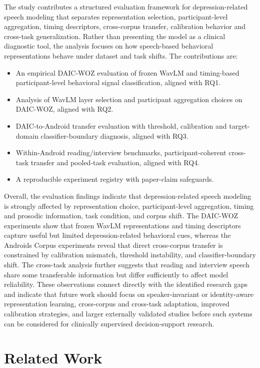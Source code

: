 \documentclass[lettersize,journal]{IEEEtran}
\begin{document}
The study contributes a structured evaluation framework for depression-related speech modeling that separates representation selection, participant-level aggregation, timing descriptors, cross-corpus transfer, calibration behavior and cross-task generalization. Rather than presenting the model as a clinical diagnostic tool, the analysis focuses on how speech-based behavioral representations behave under dataset and task shifts. The contributions are:

\begin{itemize}
\item An empirical DAIC-WOZ evaluation of frozen WavLM and timing-based participant-level behavioral signal classification, aligned with RQ1.
\item Analysis of WavLM layer selection and participant aggregation choices on DAIC-WOZ, aligned with RQ2.
\item DAIC-to-Android transfer evaluation with threshold, calibration and target-domain classifier-boundary diagnosis, aligned with RQ3.
\item Within-Android reading/interview benchmarks, participant-coherent cross-task transfer and pooled-task evaluation, aligned with RQ4.
\item A reproducible experiment registry with paper-claim safeguards.
\end{itemize}

Overall, the evaluation findings indicate that depression-related speech modeling is strongly affected by representation choice, participant-level aggregation, timing and prosodic information, task condition, and corpus shift. The DAIC-WOZ experiments show that frozen WavLM representations and timing descriptors capture useful but limited depression-related behavioral cues, whereas the Androids Corpus experiments reveal that direct cross-corpus transfer is constrained by calibration mismatch, threshold instability, and classifier-boundary shift. The cross-task analysis further suggests that reading and interview speech share some transferable information but differ sufficiently to affect model reliability. These observations connect directly with the identified research gaps and indicate that future work should focus on speaker-invariant or identity-aware representation learning, cross-corpus and cross-task adaptation, improved calibration strategies, and larger externally validated studies before such systems can be considered for clinically supervised decision-support research.

\section{Related Work}
\end{document}
